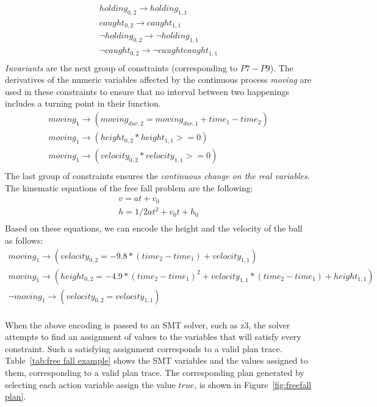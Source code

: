 $$
\begin{array}{l}
holding_{0,2} \rightarrow holding_{1,1}\\
caught_{0,2} \rightarrow caught_{1,1}\\
\neg holding_{0,2} \rightarrow \neg holding_{1,1}\\
\neg caught_{0,2} \rightarrow \neg caught caught_{1,1}\\
\end{array}
$$
\emph{Invariants} are the next group of constraints (corresponding to $P7-P9$). The derivatives of the numeric variables affected by the continuous process \textit{moving} are used in these constraints to ensure that no interval between two happenings includes a turning point in their function.
$$
\begin{array}{l}
moving_{1} \rightarrow (moving_{dur,2} = moving_{dur,1} + time_1 - time_2)\\
moving_{1} \rightarrow (height_{0,2}*height_{1,1} >= 0)\\
moving_{1} \rightarrow (velocity_{0,2}*velocity_{1,1} >= 0)\\
\end{array}
$$
The last group of constraints ensures the \emph{continuous change on the real variables}. The kinematic equations of the free fall problem are the following: 
$$
\begin{array}{l}
v = at +v_0\\ 
h = 1/2 {at^{2}} + {v_0}t + h_0 \\
\end{array}
$$
Based on these equations, we can encode the height and the velocity of the ball as follows:
$$
\begin{array}{l}
moving_{1} \rightarrow (velocity_{0,2} = -9.8 * (time_2 - time_1) + velocity_{1,1})\\
moving_{1} \rightarrow (height_{0,2} = -4.9 * (time_2 - time_1)^{2} + velocity_{1,1}*(time_2 - time_1) + height_{1,1})\\
\neg moving_{1} \rightarrow (velocity_{0,2} = velocity_{1,1})\\
\end{array}
$$

When the above encoding is passed to an SMT solver, such as {\sc z3}, the solver attempts to find an assignment of values to the variables that will satisfy every constraint. Such a satisfying assignment corresponds to a valid plan trace. Table~\ref{tab:free fall example} shows the SMT variables and the values assigned to them, corresponding to a valid plan trace. The corresponding plan generated by selecting each action variable assign the value $true$, is shown in Figure~\ref{fig:freefall plan}.

